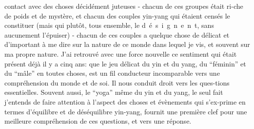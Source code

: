 
contact avec des choses décidément juteuses - chacun de ces groupes était ri-\linebreak che de poids et de mystère, et chacun des couples yin-yang qui étaient censés le constituer (mais qui plutôt, tous ensemble, le \mbox{d é s i g n e n t}, sans aucunement l'épuiser) - chacun de ces couples a quelque chose de délicat et d'important à me dire sur la nature de ce monde dans lequel je vis, et souvent sur ma propre nature. J'ai retrouvé avec une force nouvelle ce sentiment qui était présent déjà il y a cinq ans: que le jeu délicat du yin et du yang, du ``féminin'' et du ``mâle'' en toutes choses, est un fil conducteur incomparable vers une compréhension du monde et de soi. Il nous conduit droit vers les ques-\linebreak tions essentielles. Souvent aussi, le ``yoga'' même du yin et du yang, le seul fait\inserted{\unsure{,}} j'entends\inserted{\unsure{,}} de faire attention à l'aspect des choses et évènements qui s'ex-\linebreak prime en termes d'équilibre et de déséquilibre yin-yang, fournit une première clef pour une meilleure compréhension de ces questions, et vers une réponse.


